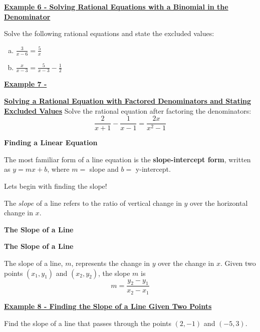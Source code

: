 \documentclass[12pt]{book}
\newcommand{\D}{\displaystyle}
\begin{document}
\newpage
\underline{\textbf{Example 6 - Solving Rational Equations with a Binomial in the Denominator}}

\vspace{1mm}
Solve the following rational equations and state the excluded values:
\vspace{1mm}
\begin{enumerate}[(a)]
    \item $\D \frac{3}{x-6} = \frac{5}{x}$
    \vspace{100mm}
    \item $\D \frac{x}{x-3} = \frac{5}{x-3} - \frac{1}{2}$
    
\end{enumerate}
\newpage
\underline{\textbf{Example 7 - }} 

\underline{\textbf{Solving a Rational Equation with Factored Denominators and Stating Excluded Values}}
Solve the rational equation after factoring the denominators: 
$$ \frac{2}{x+1} - \frac{1}{x-1} = \frac{2x}{x^2-1} $$

\newpage

{\large \textbf{Finding a Linear Equation}}

The most familiar form of a line equation is the \textbf{slope-intercept form}, written as $y=mx+b$, where $m =$ slope and $b = $ y-intercept. 

\vspace{90mm}
Lets begin with finding the slope! 

The $slope$ of a line refers to the ratio of vertical change in $y$ over the horizontal change in $x$. 



\newpage
{\large \textbf{The Slope of a Line}}

\begin{boxR}
    \textbf{The Slope of a Line}
    \vspace{1mm}
    \hline
      \vspace{2mm}

   The slope of a line, $m$, represents the change in $y$ over the change in $x$. Given two points $(x_1,y_1)$ and $(x_2,y_2)$, the slope $m$ is $$ m = \frac{y_2-y_1}{x_2-x_1}$$
\end{boxR}

\vspace{2mm}
\underline{\textbf{Example 8 - Finding the Slope of a Line Given Two Points}}

Find the slope of a line that passes through the points $(2,-1)$ and $(-5,3)$.
\end{document}
